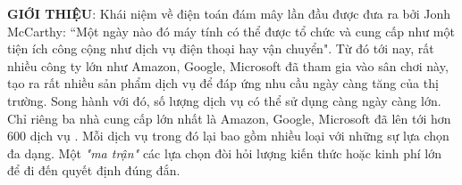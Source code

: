 \documentclass{IEEEtran}
\begin{document}
\textbf{GIỚI THIỆU}: Khái niệm về điện toán đám mây lần đầu được đưa ra bởi Jonh McCarthy: “Một ngày nào đó máy tính có thể được tổ chức và cung cấp như một tiện ích công cộng như dịch vụ điện thoại hay vận chuyển"\cite{garfinkel1999architects}. Từ đó tới nay, rất nhiều công ty lớn như Amazon, Google, Microsoft đã tham gia vào sân chơi này, tạo ra rất nhiều sản phẩm dịch vụ để đáp ứng nhu cầu ngày càng tăng của thị trường. Song hành với đó, số lượng dịch vụ có thể sử dụng càng ngày càng lớn. Chỉ riêng ba nhà cung cấp lớn nhất là Amazon, Google, Microsoft đã lên tới hơn 600 dịch vụ . Mỗi dịch vụ trong đó lại bao gồm nhiều loại với những sự lựa chọn đa dạng. Một \textit{"ma trận"} các lựa chọn đòi hỏi lượng kiến thức hoặc kinh phí lớn để đi đến quyết định đúng đắn.\\
\end{document}
